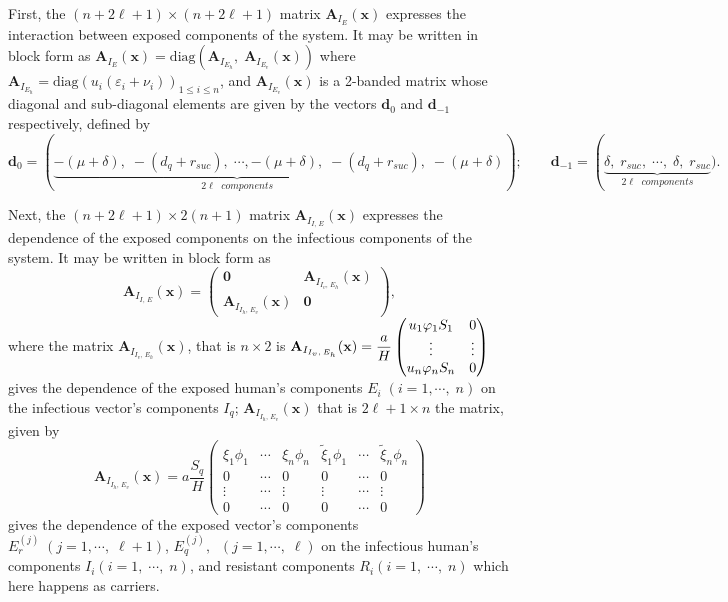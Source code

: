 \documentclass[a4paper]{article}
\newcommand{\diag}{\mathrm{diag}}
\newcommand{\mb}{\mathbf}
\newcommand{\varpiVar}{r_{suc}}
\newcommand{\hatmuVar}{d_q}
\begin{document}
First, the  $(n+2\ell+1)\times(n+2\ell+1)$ matrix $\mb A_{I_E}(\mathbf x)$  expresses the interaction between exposed components of the system. It  may be written in block  form as $\mb A_{I_E}(\mathbf x) =\diag\left(\mb A_{I_{E_h}},\;\mb A_{I_{E_v}}(\mathbf x)\right)$ where $\mb A_{I_{E_h}} = \diag\left(u_i(\varepsilon_i+\nu_i)\right)_{1\leq i\leq n}$, and $\mb A_{I_{E_v}}(\mathbf x)$  is a 2-banded matrix whose diagonal and sub-diagonal elements are given by  the vectors $\mathbf d_0$ and $\mathbf d_{-1}$ respectively, defined by
\begin{equation}\label{eq.eqdiagelts}\mathbf d_0 = {\left(\right.}\underbrace{-(\mu+\delta),\; -(\hatmuVar +\varpiVar ),\;\cdots,-(\mu+\delta),\;
-(\hatmuVar +\varpiVar )}_{2\ell\;\; components},\;-(\mu+\delta) {\left.\right)};\qquad \mathbf d_{-1} = {\left(\right.} \underbrace{ \delta, \;\varpiVar , \;\cdots,
\;\delta,\;\varpiVar }_{2\ell\;\;components}{\left.\right.).}\end{equation} 

Next, the  $(n+2\ell+1)\times 2(n+1)$ matrix $\mathbf A_{I_{I,\,E}}(\mathbf x)$  expresses the dependence of the exposed components on the infectious components of the system. It  may be written in block  form as
\[
\mathbf A_{I_{I,\,E}}(\mathbf x) =    \left(\begin{array}{cc} \mathbf 0
&   \mathbf A_{I_{{I_v},\,{E_h}}}(\mathbf x) \\ \mathbf A_{I_{{I_h},\,{E_v}}}(\mathbf x) &  \mathbf
0 \end{array}\right),
\label{eq:matei}
\]
where the matrix $\mathbf A_{I_{{I_v},\,{E_h}}}(\mathbf x)$, that is $n\times2$ is  $\mathbf A_{I_{{I_v},\,{E_h}}}(\mathbf x) = \dfrac{a}{H}\begin{pmatrix}
u_1\varphi_1 S_1&0\cr\vdots&\vdots\cr u_n\varphi_n S_n&0
\end{pmatrix}$  gives the dependence of the exposed human's components $E_{i}\; (i=1,\cdots,\; n)$  on the infectious vector's components $I_q$; $\mathbf A_{I_{{I_h},\,{E_v}}}(\mathbf x)$ that is $2\ell+1\times n$ the matrix, given by  
\[
 \mathbf A_{I_{{I_h},\,{E_v}}}(\mathbf x)=a\frac{S_q}{H}\begin{pmatrix}\xi_1\phi_1&\cdots & \xi_n\phi_n & \widetilde\xi_1\phi_1&\cdots & \widetilde\xi_n\phi_n\\0 & \cdots&0 & 0 & \cdots&0\\\vdots&\cdots&\vdots & \vdots&\cdots&\vdots\\0 & \cdots&0 & 0 & \cdots&0\end{pmatrix}
\]
  gives the dependence of the exposed vector's components $E_r^{(j)}\; (j=1,\cdots,\; \ell+1)$, $E_q^{(j)},\;\; (j=1,\cdots,\; \ell)$ on the infectious human's components $I_i (i=1,\;\cdots,\; n)$, and resistant components  $R_i (i=1,\;\cdots,\; n)$ which here happens as carriers. 
\end{document}
